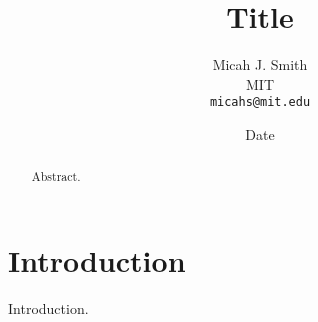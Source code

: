 \documentclass[conference,a4paper]{article}
\author{
    Micah J. Smith\\
    MIT\\
    \texttt{micahs@mit.edu}
}
\date{Date}
\title{Title}
\begin{document}
\maketitle

\begin{abstract}
    Abstract.
\end{abstract}

\section{Introduction}

Introduction.
\end{document}
